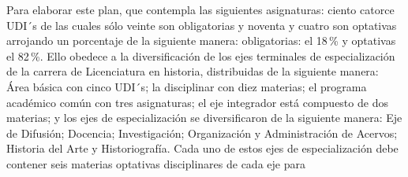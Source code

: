 Para elaborar este plan, que contempla las siguientes asignaturas: 
ciento catorce UDI´s de las cuales sólo veinte son obligatorias y 
noventa y cuatro son optativas arrojando un porcentaje de la siguiente 
manera: obligatorias: el 18\,\% y optativas el 82\,\%. Ello obedece a 
la diversificación de los ejes terminales de especialización de la 
carrera de Licenciatura en historia, distribuidas de la siguiente 
manera: Área básica con cinco UDI´s; la disciplinar con diez materias; 
el programa académico común con tres asignaturas; el eje integrador 
está compuesto de dos materias; y los ejes de especialización se 
diversificaron de la siguiente manera: Eje de Difusión; Docencia; 
Investigación; Organización y Administración de Acervos; Historia del 
Arte y Historiografía. Cada uno de estos ejes de especialización debe 
contener seis materias optativas disciplinares de cada eje para 
